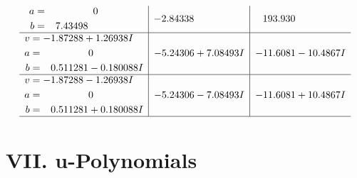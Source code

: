 \documentclass[1p]{elsarticle_modified}
\theoremstyle{definition}
\begin{document}
$$\begin{array}{c|c|c}
\begin{aligned}
a &= \phantom{-0.000000 } 0 \\
b &= \phantom{-}7.43498\phantom{ +0.000000I}\end{aligned}
 & -2.84338\phantom{ +0.000000I} & \phantom{-}193.930\phantom{ +0.000000I} \\ \hline\begin{aligned}
v &= -1.87288 + 1.26938 I \\
a &= \phantom{-0.000000 } 0 \\
b &= \phantom{-}0.511281 - 0.180088 I\end{aligned}
 & -5.24306 + 7.08493 I & -11.6081 - 10.4867 I \\ \hline\begin{aligned}
v &= -1.87288 - 1.26938 I \\
a &= \phantom{-0.000000 } 0 \\
b &= \phantom{-}0.511281 + 0.180088 I\end{aligned}
 & -5.24306 - 7.08493 I & -11.6081 + 10.4867 I\\
 \hline 
 \end{array}$$\newpage
\newpage\renewcommand{\arraystretch}{1}
\centering \section*{ VII. u-Polynomials}
\end{document}
